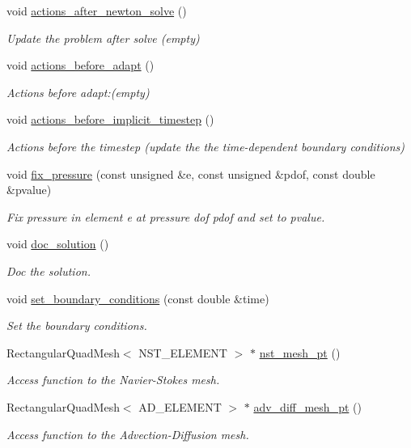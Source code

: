 \begin{DoxyCompactItemize}
void \hyperlink{classConvectionProblem_a6b6c035decf5f1e2aa64b591563e5ae4}{actions\+\_\+after\+\_\+newton\+\_\+solve} ()
\begin{DoxyCompactList}\small\item\em Update the problem after solve (empty) \end{DoxyCompactList}\item 
void \hyperlink{classConvectionProblem_ac546cecdb98a75923d0a5af4b0a223a1}{actions\+\_\+before\+\_\+adapt} ()
\begin{DoxyCompactList}\small\item\em Actions before adapt\+:(empty) \end{DoxyCompactList}\item 
void \hyperlink{classConvectionProblem_a37c80882d173c02bfb3dfca924a4ec61}{actions\+\_\+before\+\_\+implicit\+\_\+timestep} ()
\begin{DoxyCompactList}\small\item\em Actions before the timestep (update the the time-\/dependent boundary conditions) \end{DoxyCompactList}\item 
void \hyperlink{classConvectionProblem_a5f4904e658a5888814e825ac060c8f71}{fix\+\_\+pressure} (const unsigned \&e, const unsigned \&pdof, const double \&pvalue)
\begin{DoxyCompactList}\small\item\em Fix pressure in element e at pressure dof pdof and set to pvalue. \end{DoxyCompactList}\item 
void \hyperlink{classConvectionProblem_a577e6ccb8106cbf3b2cede3bf4af7c24}{doc\+\_\+solution} ()
\begin{DoxyCompactList}\small\item\em Doc the solution. \end{DoxyCompactList}\item 
void \hyperlink{classConvectionProblem_a3b2e60458eead30fb143002a631683b7}{set\+\_\+boundary\+\_\+conditions} (const double \&time)
\begin{DoxyCompactList}\small\item\em Set the boundary conditions. \end{DoxyCompactList}\item 
Rectangular\+Quad\+Mesh$<$ N\+S\+T\+\_\+\+E\+L\+E\+M\+E\+NT $>$ $\ast$ \hyperlink{classConvectionProblem_a55cd8ffe7b4aa2165639dfdbe6006962}{nst\+\_\+mesh\+\_\+pt} ()
\begin{DoxyCompactList}\small\item\em Access function to the Navier-\/\+Stokes mesh. \end{DoxyCompactList}\item 
Rectangular\+Quad\+Mesh$<$ A\+D\+\_\+\+E\+L\+E\+M\+E\+NT $>$ $\ast$ \hyperlink{classConvectionProblem_a2c9c128da7f75c636ea04ac5643abf39}{adv\+\_\+diff\+\_\+mesh\+\_\+pt} ()
\begin{DoxyCompactList}\small\item\em Access function to the Advection-\/\+Diffusion mesh. \end{DoxyCompactList}\end{DoxyCompactItemize}

